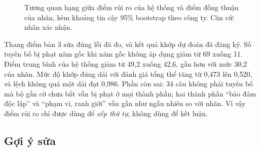 \begin{figure}[htbp]
\centering
{}
\caption[Tương quan hạng giữa điểm rủi ro và điểm đồng thuận]{Tương quan hạng giữa điểm rủi ro của hệ thống và điểm đồng thuận của nhãn, kèm khoảng tin cậy 95\% bootstrap theo công ty. Căn cứ: nhãn xác nhận.}\label{fig:rho}
\end{figure}

Thang điểm bản 3 sửa đúng lỗi đã đo, và kết quả khớp dự đoán đã đăng ký. Số tuyên bố bị phạt năm gốc khi năm gốc không áp dụng giảm từ 69 xuống 11. Điểm trung bình của hệ thống giảm từ 49,2 xuống 42,6, gần hơn với mức 30,2 của nhãn. Mức độ khớp đúng dải với đánh giá tổng thể tăng từ 0,473 lên 0,520, và lệch không quá một dải đạt 0,986. Phần còn sai: 34 câu không phải tuyên bố mà bộ gắn cờ chưa bắt vẫn bị phạt ở mọi thành phần; hai thành phần “bảo đảm độc lập” và “phạm vi, ranh giới” vẫn gần như ngẫu nhiên so với nhãn. Vì vậy điểm rủi ro chỉ được dùng để \emph{xếp thứ tự}, không dùng để kết luận.

\subsection{Gợi ý sửa}

